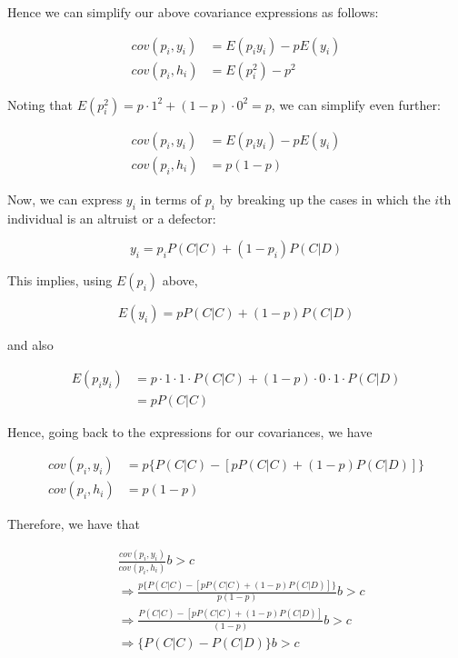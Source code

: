 \documentclass{article}
\begin{document}
Hence we can simplify our above covariance expressions as follows:

\begin{align*}
    cov(p_i, y_i) &= E(p_i y_i) - p E(y_i) \\
    cov(p_i, h_i) &= E(p_i^2) - p^2
\end{align*}

Noting that $E(p_i^2) = p \cdot 1^2 + (1 - p) \cdot 0^2 = p$, we can
simplify even further:

\begin{align*}
    cov(p_i, y_i) &= E(p_i y_i) - p E(y_i) \\
    cov(p_i, h_i) &= p (1 - p)
\end{align*}

Now, we can express $y_i$ in terms of $p_i$ by breaking up the cases in
which the $i$th individual is an altruist or a defector:

\begin{equation*}
    y_i = p_i P(C|C) + (1 - p_i) P(C|D)
\end{equation*}

This implies, using $E(p_i)$ above,

\begin{equation*}
    E(y_i) = p P(C|C) + (1 - p) P(C|D)
\end{equation*}

and also

\begin{align*}
    E(p_i y_i) &= p \cdot 1 \cdot 1 \cdot P(C|C) + (1 - p) \cdot 0 \cdot 1 \cdot P(C|D) \\
               &= p P(C|C)
\end{align*}

Hence, going back to the expressions for our covariances, we have

\begin{align*}
    cov(p_i, y_i) &= p \{P(C|C) - [p P(C|C) + (1 - p) P(C|D)]\} \\
    cov(p_i, h_i) &= p (1 - p)
\end{align*}

Therefore, we have that

\begin{align*}
    &\frac{cov(p_i, y_i)}{cov(p_i, h_i)} b > c \\
    &\Rightarrow \frac{p \{P(C|C) - [p P(C|C) + (1 - p) P(C|D)]\}}{p (1 - p)} b > c \\
    &\Rightarrow \frac{P(C|C) - [p P(C|C) + (1 - p) P(C|D)]}{(1 - p)} b > c \\
    &\Rightarrow \{P(C|C) - P(C|D)\} b > c
\end{align*}
\end{document}
